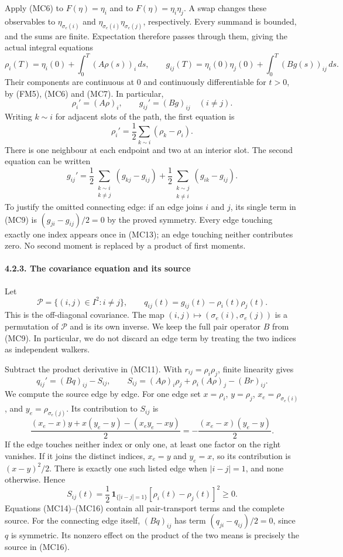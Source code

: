 \documentclass[
  11pt,
  a4paper,
]{article}
\begin{document}
Apply (MC6) to \(F(\eta)=\eta_i\) and to \(F(\eta)=\eta_i\eta_j\). A
swap changes these observables to \(\eta_{\sigma_e(i)}\) and
\(\eta_{\sigma_e(i)}\eta_{\sigma_e(j)}\), respectively. Every summand is
bounded, and the sums are finite. Expectation therefore passes through
them, giving the actual integral equations \[
\rho_i(T)=\eta_i(0)+\int_0^T(A\rho(s))_i\,ds,
\qquad
g_{ij}(T)=\eta_i(0)\eta_j(0)+\int_0^T(Bg(s))_{ij}\,ds.
\tag{MC10}
\] Their components are continuous at \(0\) and continuously
differentiable for \(t>0\), by (FM5), (MC6) and (MC7). In particular, \[
\rho_i'=(A\rho)_i,
\qquad g_{ij}'=(Bg)_{ij}\quad(i\ne j).
\tag{MC11}
\] Writing \(k\sim i\) for adjacent slots of the path, the first
equation is \[
\rho_i'=\frac12\sum_{k\sim i}(\rho_k-\rho_i).
\tag{MC12}
\] There is one neighbour at each endpoint and two at an interior slot.
The second equation can be written \[
g_{ij}'=
\frac12\sum_{\substack{k\sim i\\k\ne j}}(g_{kj}-g_{ij})
+\frac12\sum_{\substack{k\sim j\\k\ne i}}(g_{ik}-g_{ij}).
\tag{MC13}
\] To justify the omitted connecting edge: if an edge joins \(i\) and
\(j\), its single term in (MC9) is \((g_{ji}-g_{ij})/2=0\) by the proved
symmetry. Every edge touching exactly one index appears once in (MC13);
an edge touching neither contributes zero. No second moment is replaced
by a product of first moments.

\paragraph{4.2.3. The covariance equation and its
source}\label{the-covariance-equation-and-its-source}

Let \[
\mathcal P=\{(i,j)\in I^2:i\ne j\},\qquad
q_{ij}(t)=g_{ij}(t)-\rho_i(t)\rho_j(t).
\] This is the off-diagonal covariance. The map
\((i,j)\mapsto(\sigma_e(i),\sigma_e(j))\) is a permutation of
\(\mathcal P\) and is its own inverse. We keep the full pair operator
\(B\) from (MC9). In particular, we do not discard an edge term by
treating the two indices as independent walkers.

Subtract the product derivative in (MC11). With \(r_{ij}=\rho_i\rho_j\),
finite linearity gives \[
q_{ij}'=(Bq)_{ij}-S_{ij},\qquad
S_{ij}=(A\rho)_i\rho_j+\rho_i(A\rho)_j-(Br)_{ij}.
\tag{MC14}
\] We compute the source edge by edge. For one edge set \(x=\rho_i\),
\(y=\rho_j\), \(x_e=\rho_{\sigma_e(i)}\), and
\(y_e=\rho_{\sigma_e(j)}\). Its contribution to \(S_{ij}\) is \[
\frac{(x_e-x)y+x(y_e-y)-(x_e y_e-xy)}2
=-\frac{(x_e-x)(y_e-y)}2.
\tag{MC15}
\] If the edge touches neither index or only one, at least one factor on
the right vanishes. If it joins the distinct indices, \(x_e=y\) and
\(y_e=x\), so its contribution is \((x-y)^2/2\). There is exactly one
such listed edge when \(|i-j|=1\), and none otherwise. Hence \[
S_{ij}(t)=\frac12\,\mathbf 1_{\{|i-j|=1\}}
[\rho_i(t)-\rho_j(t)]^2\geq0.
\tag{MC16}
\] Equations (MC14)--(MC16) contain all pair-transport terms and the
complete source. For the connecting edge itself, \((Bq)_{ij}\) has term
\((q_{ji}-q_{ij})/2=0\), since \(q\) is symmetric. Its nonzero effect on
the product of the two means is precisely the source in (MC16).
\end{document}
